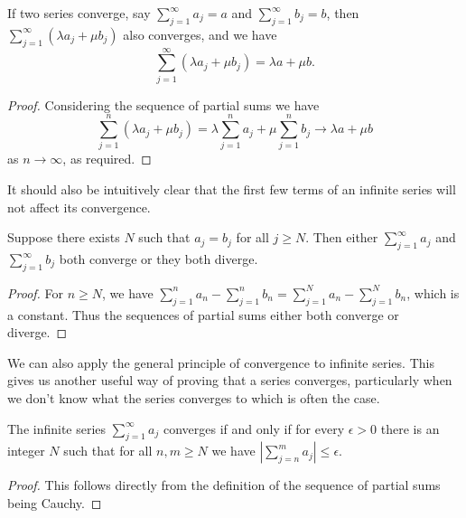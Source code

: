 \begin{proposition}
	If two series converge, say $\sum_{j = 1}^{\infty} a_j = a$ and $\sum_{j = 1}^{\infty} b_j = b$, then $\sum_{j = 1}^{\infty} (\lambda a_j + \mu b_j)$ also converges, and we have
	$$
	\sum_{j = 1}^{\infty} (\lambda a_j + \mu b_j) = \lambda a + \mu b.
	$$
\end{proposition}
\begin{proof}
	Considering the sequence of partial sums we have
	$$
	\sum_{j = 1}^n (\lambda a_j + \mu b_j) = \lambda \sum_{j=1}^n a_j + \mu \sum_{j = 1}^n b_j \longrightarrow \lambda a + \mu b
	$$
	as $n \rightarrow \infty$, as required.
\end{proof}

It should also be intuitively clear that the first few terms of an infinite series will not affect its convergence.

\begin{proposition}
Suppose there exists $N$ such that $a_j = b_j$ for all $j \geq N$. Then either $\sum_{j = 1}^{\infty} a_j$ and $\sum_{j = 1}^{\infty} b_j$ both converge or they both diverge.
\end{proposition}
\begin{proof}
	For $n \geq N$, we have $\sum_{j = 1}^n a_n - \sum_{j = 1}^n b_n =  \sum_{j = 1}^N a_n - \sum_{j = 1}^N b_n$, which is a constant. Thus the sequences of partial sums either both converge or diverge.
\end{proof}

We can also apply the general principle of convergence to infinite series. This gives us another useful way of proving that a series converges, particularly when we don't know what the series converges to which is often the case.

\begin{theorem}
	The infinite series $\sum_{j = 1}^{\infty} a_j$ converges if and only if for every $\epsilon > 0$ there is an integer $N$ such that for all $n, m \geq N$ we have $|\sum_{j = n}^m a_j| \leq \epsilon$.
\end{theorem}
\begin{proof}
	This follows directly from the definition of the sequence of partial sums being Cauchy.
\end{proof}





